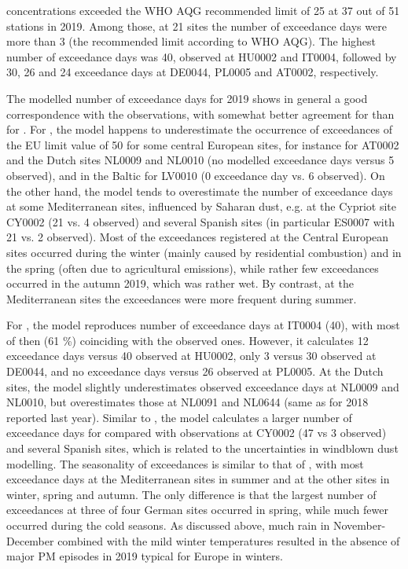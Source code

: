 \PM[2.5] concentrations exceeded the WHO AQG recommended limit of 25 \ug at 37 out of 51
stations in 2019. Among those, at 21 sites the number of exceedance
days were more than 3 (the recommended limit according to WHO AQG). 
The highest number of exceedance days was 40, observed at HU0002 and IT0004, followed by 30, 26 and 24 exceedance days at DE0044, PL0005 and AT0002, respectively.

The modelled number of exceedance days for 2019 shows in general a good correspondence with the observations, with somewhat better agreement for \PM[10] than for \PM[2.5]. For \PM[10], the model happens to underestimate the occurrence of exceedances of the EU limit value of 50 \ug for some central European sites, for instance for AT0002 and the Dutch sites NL0009 and NL0010 (no modelled exceedance days versus 5 observed), and in the Baltic for LV0010 (0 exceedance day vs. 6 observed). On the other hand, the model tends to overestimate the number of exceedance days at some Mediterranean sites, influenced by Saharan dust, e.g. at the Cypriot site CY0002 (21 vs. 4 observed) and several Spanish sites (in particular ES0007 with 21 vs. 2 observed). Most of the exceedances registered at the Central European sites occurred during the winter (mainly caused by residential combustion) and in the spring (often due to agricultural emissions), while rather few exceedances occurred in the autumn 2019, which was rather wet. By contrast, at the Mediterranean sites the exceedances were more frequent during summer.

For \PM[2.5], the model reproduces number of exceedance days at IT0004 (40), with most of then (61 \%) coinciding with the observed ones. However, it calculates 12 exceedance days versus 40 observed at HU0002, only 3 versus 30 observed at DE0044, and no exceedance days versus 26 observed at PL0005. At the Dutch sites, the model slightly underestimates observed \PM[2.5] exceedance days at NL0009 and NL0010, but overestimates those at NL0091 and NL0644 (same as for 2018 reported last year). Similar to \PM[10], the model calculates a larger number of exceedance days for \PM[2.5] compared with observations at CY0002 (47 vs 3 observed) and several Spanish sites, which is related to the uncertainties in windblown dust modelling. The seasonality of \PM[2.5] exceedances is similar to that of \PM[10], with most exceedance days at the Mediterranean sites in summer and at the other sites in winter, spring and autumn. The only difference is that the largest number of \PM[2.5] exceedances at three of four German sites occurred in spring, while much fewer occurred during the cold seasons. As discussed above, much rain in November-December combined with the mild winter temperatures resulted in the absence of major PM episodes in 2019 typical for Europe in winters.

